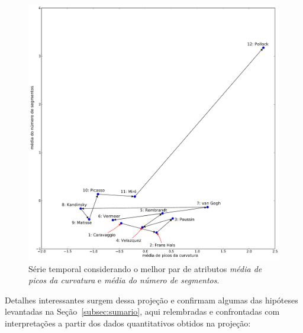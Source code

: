 \begin{figure}[h!]
\begin{center}
         \caption{Série temporal considerando o melhor par de atributos
        \emph{média de picos da curvatura} e \emph{média do número de
          segmentos}.}
        \label{fig:caso1_g2}
        \includegraphics[scale=.5]{figs/caso1_g2}
        \fonteminha
\end{center}
\end{figure}

Detalhes interessantes surgem dessa projeção e confirmam
algumas das hipóteses levantadas na Seção~\ref{subsec:sumario}, aqui
relembradas e confrontadas com interpretações a partir dos dados
quantitativos obtidos na projeção:

